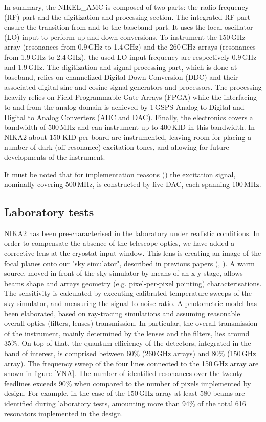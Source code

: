 \documentclass[]{aa} %
\begin{document}
In summary, the NIKEL\_AMC is composed of two parts: the radio-frequency (RF) part and the digitization and processing section.
The integrated RF part ensure the transition from and to the baseband part.
It uses the local oscillator (LO) input to perform up and down-conversions.
To instrument the 150\,GHz array (resonances from 0.9\,GHz to 1.4\,GHz) and the 260\,GHz arrays (resonances from 1.9\,GHz to 2.4\,GHz), the used LO input frequency are respectively 0.9\,GHz and 1.9\,GHz. The digitization and signal processing part, which is done at baseband, relies on channelized Digital Down Conversion (DDC) and their associated digital sine and cosine signal generators and processors.
The processing heavily relies on Field Programmable Gate Arrays (FPGA) while the interfacing to and from the analog domain is achieved by 1\,GSPS Analog to Digital and Digital to Analog Converters (ADC and DAC).
Finally, the electronics covers a bandwidth of 500\,MHz and can instrument up to 400\,KID in this bandwidth. In NIKA2 about 150 KID per board are instrumented, leaving room for placing a number of dark (off-resonance) excitation tones, and allowing for future developments of the instrument. 

It must be noted that for implementation reasons (\cite{Bourrion2012,Bourrion2016}) the excitation signal, nominally covering 500\,MHz, is constructed by five DAC, each spanning 100\,MHz.



\subsection{Laboratory tests}
\label{Laboratory tests}

NIKA2 has been pre-characterised in the laboratory under realistic conditions. In order to compensate the absence of the telescope optics, we have added a corrective lens at the cryostat input window. This lens is creating an image of the focal planes onto our "sky simulator", described in previous papers (\cite{Catalano2014}, \cite{Monfardini2011}). A warm source, moved in front of the sky simulator by means of an x-y stage, allows beams shape and arrays geometry (e.g. pixel-per-pixel pointing) characterisations. The sensitivity is calculated by executing calibrated temperature sweeps of the sky simulator, and measuring the signal-to-noise ratio. A photometric model has been elaborated, based on ray-tracing simulations and assuming reasonable overall optics (filters, lenses) transmission. In particular, the overall transmission of the instrument, mainly determined by the lenses and the filters, lies around 35\%. On top of that, the quantum efficiency of the detectors, integrated in the band of interest, is comprised between 60\% (260\,GHz arrays) and 80\% (150\,GHz array). The frequency sweep of the four lines connected to the 150\,GHz array are shown in figure \ref{VNA}. The number of identified resonances over the twenty feedlines exceeds 90\% when compared to the number of pixels implemented by design. For example, in the case of the 150\,GHz array at least 580 beams are identified during laboratory tests, amounting more than 94\% of the total 616 resonators implemented in the design. 
\end{document}
